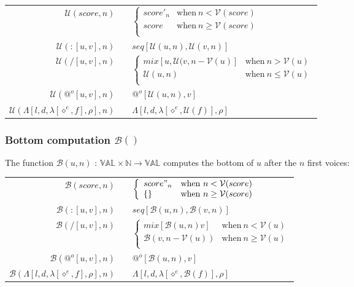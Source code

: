 \documentclass[10pt,a4paper,frenchb]{article}
\makeatletter
\newcommand{\seq}{:}
\newcommand{\var}[1]{\diamond^#1}
\newcommand{\es}{\{\}}
\newcommand{\val}{\mathbb{VAL}}
\newcommand{\closure}{\Lambda}
\newcommand{\noredex}{@^o}
\newcommand{\f}[3]{$#1 \times #2 \rightarrow #3$}
\newcommand{\envsym}{\rho}
\newcommand{\closenv}[4][\var{e}]{\closure[#3,#4,\lambda[#1,#2],\envsym]}
\newcommand{\voices}	{{\mathcal V}}
\renewcommand{\top}	{{\mathcal U}}
\newcommand{\bottom}	{{\mathcal B}}
\makeatother
\begin{document}
\begin{center}
\begin{tabular*}{12cm}{rc@{ $\rightarrow$ }l}
 \hline
 $\top(score,n)$				& & $\left\{ \begin{array}{ll}
 								score'_{n} & \mathrm{when} \  n < \voices(score) \\
								score & \mathrm{when} \  n \geq \voices(score) \\
	 							\end{array} \right.$ \\
 $\top(\seq [u,v],n)$		& & $seq[\top(u, n),\top(v, n)]$ \\
 $\top(/ [u,v],n)$ 			& & $\left\{ \begin{array}{ll}
 								mix[u,\top(v,n-\voices(u)] & \mathrm{when} \  n > \voices(u) \\
								\top(u,n) & \mathrm{when} \  n \leq\voices(u) \\
	 							\end{array} \right.$ \\
 $\top(\noredex [u,v],n)$ 	& & $\noredex[\top(u,n),v]$ \\
 $\top(\closenv{f}{l}{d},n)$ 	& &  $\closenv{\top(f)}{l}{d}$ \\
 \hline
\end{tabular*}
\end{center}

\subsubsection{Bottom computation $\bottom()$}
The function $\bottom(u,n)$ :  \f{\val}{\mathbb{N}}{\val} computes the bottom of $u$ after the $n$ first voices:

\begin{center}
\begin{tabular*}{12cm}{rc@{ $\rightarrow$ }l}
 \hline
 $\bottom(score,n)$				& & $\left\{ \begin{array}{ll}
 								score"_{n} & \mathrm{when} \  n < \voices(score) \\
								\es & \mathrm{when} \  n \geq \voices(score) \\
	 							\end{array} \right.$ \\
 $\bottom(\seq [u,v],n)$		& & $seq[\bottom(u, n), \bottom(v, n)]$ \\
 $\bottom(/ [u,v],n)$ 			& & $\left\{ \begin{array}{ll}
 								mix[\bottom(u,n) v] & \mathrm{when} \  n < \voices(u) \\
								\bottom(v,n - \voices(u)) & \mathrm{when} \  n \geq\voices(u) \\
	 							\end{array} \right.$ \\
 $\bottom(\noredex [u,v],n)$ 	& & $\noredex[\bottom(u,n),v]$ \\
 $\bottom(\closenv{f}{l}{d},n)$ 	& &  $\closenv{\bottom(f)}{l}{d}$ \\
 \hline
\end{tabular*}
\end{center}
\end{document}
